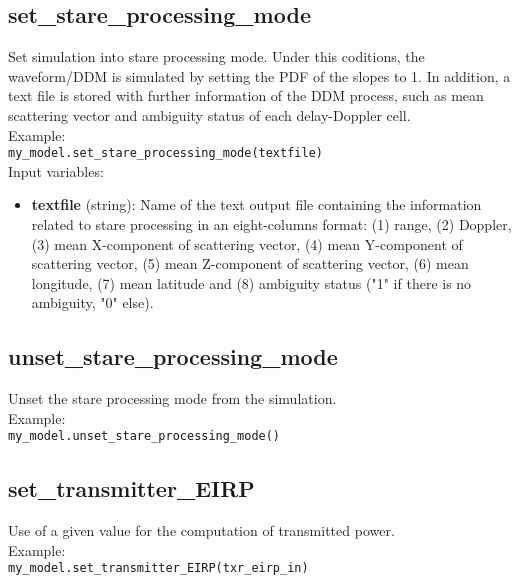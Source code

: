 \subsection{set\_stare\_processing\_mode}

Set simulation into stare processing mode. Under this coditions, the waveform/DDM is simulated by setting the PDF of the slopes to 1. In addition, a text file is stored with further information of the DDM process, such as mean scattering vector and ambiguity status of each delay-Doppler cell.\\

Example:\\

\texttt{my\_model.set\_stare\_processing\_mode(textfile)}\\

Input variables:
\begin{itemize}
\item {\bf textfile} (string): Name of the text output file containing the information related to stare processing in an eight-columns format: (1) range, (2) Doppler, (3) mean X-component of scattering vector, (4) mean Y-component of scattering vector, (5) mean Z-component of scattering vector, (6) mean longitude, (7) mean latitude and (8) ambiguity status ("1" if there is no ambiguity, "0" else).
\end{itemize}


\subsection{unset\_stare\_processing\_mode}

Unset the stare processing mode from the simulation.\\

Example:\\

\texttt{my\_model.unset\_stare\_processing\_mode()}\\


\subsection{set\_transmitter\_EIRP}

Use of a given value for the computation of transmitted power.\\

Example:\\

\texttt{my\_model.set\_transmitter\_EIRP(txr\_eirp\_in)}\\

